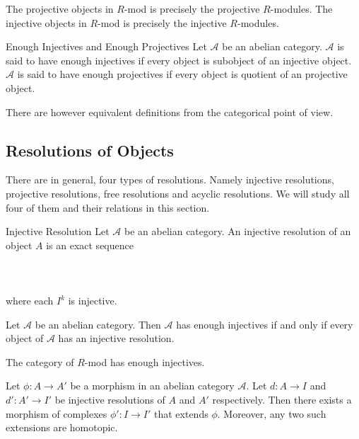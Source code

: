 \documentclass[a4paper]{article}
\begin{document}
\begin{lmm}{}{} The projective objects in $R$-mod is precisely the projective $R$-modules. The injective objects in $R$-mod is precisely the injective $R$-modules. 
\end{lmm}

\begin{defn}{Enough Injectives and Enough Projectives}{} Let $\mathcal{A}$ be an abelian category. $\mathcal{A}$ is said to have enough injectives if every object is subobject of an injective object. $\mathcal{A}$ is said to have enough projectives if every object is quotient of an projective object. 
\end{defn}

There are however equivalent definitions from the categorical point of view. 

\subsection{Resolutions of Objects}
There are in general, four types of resolutions. Namely injective resolutions, projective resolutions, free resolutions and acyclic resolutions. We will study all four of them and their relations in this section. 

\begin{defn}{Injective Resolution}{} Let $\mathcal{A}$ be an abelian category. An injective resolution of an object $A$ is an exact sequence \\~\\
\\~\\
where each $I^k$ is injective. 
\end{defn}

\begin{thm}{}{} Let $\mathcal{A}$ be an abelian category. Then $\mathcal{A}$ has enough injectives if and only if every object of $\mathcal{A}$ has an injective resolution. 
\end{thm}

\begin{thm}{}{} The category of $R$-mod has enough injectives. 
\end{thm}

\begin{prp}{}{} Let $\phi:A\to A'$ be a morphism in an abelian category $\mathcal{A}$. Let $d:A\to I$ and $d':A'\to I'$ be injective resolutions of $A$ and $A'$ respectively. Then there exists a morphism of complexes $\phi':I\to I'$ that extends $\phi$. Moreover, any two such extensions are homotopic. 
\end{prp}
\end{document}
